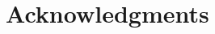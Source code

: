\documentclass[conference]{IEEEtran}
\begin{document}







\section*{Acknowledgments}




\end{document}
